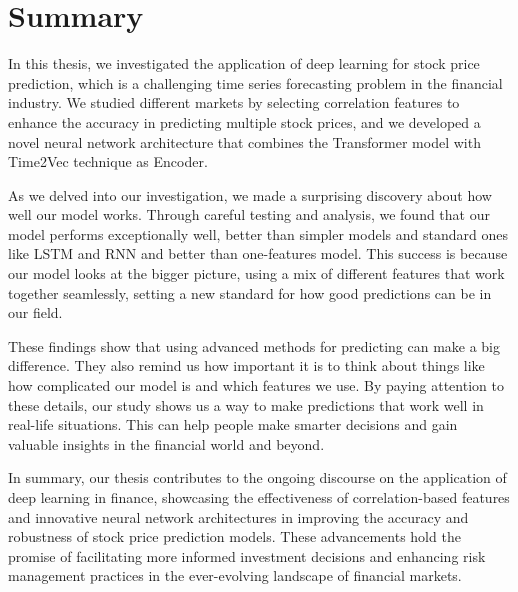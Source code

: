 \chapter{Summary}
\label{ch:summary}

In this thesis, we investigated the application of deep learning for stock price prediction, which is a challenging time series forecasting problem in the financial industry. We studied different markets by selecting correlation features to enhance the accuracy in predicting multiple stock prices, and we developed a novel neural network architecture that combines the Transformer model with Time2Vec technique as Encoder.

As we delved into our investigation, we made a surprising discovery about how well our model works. Through careful testing and analysis, we found that our model performs exceptionally well, better than simpler models and standard ones like LSTM and RNN and better than one-features model. This success is because our model looks at the bigger picture, using a mix of different features that work together seamlessly, setting a new standard for how good predictions can be in our field.

These findings show that using advanced methods for predicting can make a big difference. They also remind us how important it is to think about things like how complicated our model is and which features we use. By paying attention to these details, our study shows us a way to make predictions that work well in real-life situations. This can help people make smarter decisions and gain valuable insights in the financial world and beyond.

In summary, our thesis contributes to the ongoing discourse on the application of deep learning in finance, showcasing the effectiveness of correlation-based features and innovative neural network architectures in improving the accuracy and robustness of stock price prediction models. These advancements hold the promise of facilitating more informed investment decisions and enhancing risk management practices in the ever-evolving landscape of financial markets.
